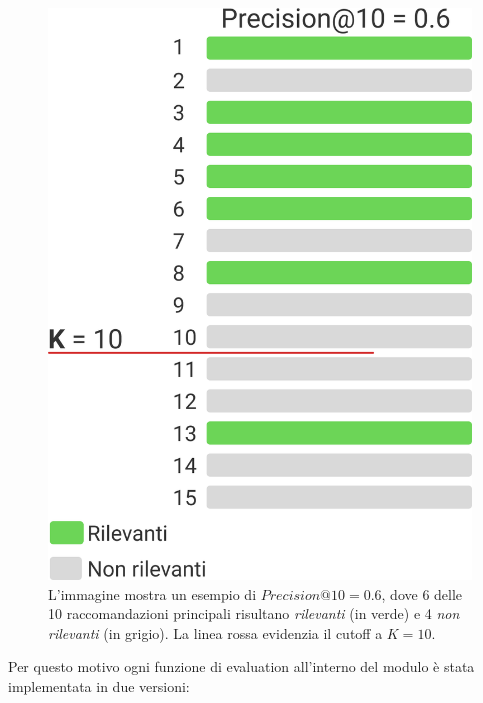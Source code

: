 \begin{figure}[htbp]
    \centering
    \includegraphics[scale=0.7]{figures/algorithms/precision_@_k.png}
    \caption{L'immagine mostra un esempio di $Precision@10 = 0{.}6$, dove 6 delle 10 raccomandazioni principali risultano \textit{rilevanti} (in verde) e 4 \textit{non rilevanti} (in grigio). La linea rossa evidenzia il cutoff a $K = 10$.}
\end{figure}

Per questo motivo ogni funzione di evaluation all'interno del modulo è stata implementata in due versioni:

